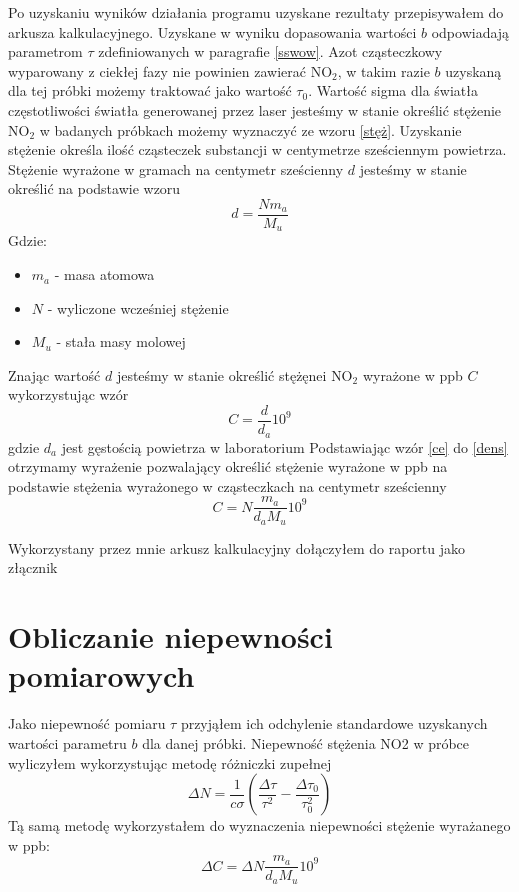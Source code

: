 \documentclass[10pt,a4paper]{article}
\begin{document}
Po uzyskaniu wyników działania programu uzyskane rezultaty przepisywałem do arkusza kalkulacyjnego. Uzyskane w wyniku dopasowania wartości $b$ odpowiadają parametrom $\tau$ zdefiniowanych w paragrafie \ref{sswow}. Azot cząsteczkowy wyparowany z ciekłej fazy nie powinien zawierać $\text{NO}_{\text{2}}$, w takim razie $b$ uzyskaną dla tej próbki możemy traktować jako wartość $\tau_0$. Wartość sigma dla światła częstotliwości  światła generowanej przez laser jesteśmy w stanie określić stężenie $\text{NO}_{\text{2}}$ w badanych próbkach możemy wyznaczyć ze wzoru \ref{stęż}.  Uzyskanie stężenie określa ilość cząsteczek substancji w centymetrze sześciennym powietrza.  
Stężenie wyrażone w gramach na centymetr sześcienny $d$ jesteśmy w stanie określić na podstawie wzoru
\begin{equation}
    \label{dens}
    d = \frac{N m_a}{M_u}
\end{equation}
Gdzie:
\begin{itemize}
    \item $m_a$ - masa atomowa
    \item $N$ - wyliczone wcześniej stężenie
    \item $M_u$ - stała masy molowej
\end{itemize}
 Znając wartość $d$ jesteśmy w stanie określić stężęnei $\text{NO}_{\text{2}}$ wyrażone w ppb $C$ wykorzystując wzór
\begin{equation}
    \label{ce}
    C=\frac{d}{d_a} 10^9
\end{equation}
gdzie $d_a$ jest gęstością powietrza w laboratorium
Podstawiając wzór \ref{ce} do \ref{dens} otrzymamy wyrażenie pozwalający określić stężenie wyrażone w ppb na podstawie stężenia wyrażonego w cząsteczkach na centymetr sześcienny
\begin{equation}
    \label{cer}
    C = N \frac{m_a}{d_a M_u}10^9
\end{equation}

Wykorzystany przez mnie arkusz kalkulacyjny dołączyłem do raportu jako złącznik


\section{Obliczanie niepewności pomiarowych}

Jako niepewność pomiaru $\tau$ przyjąłem ich odchylenie standardowe uzyskanych wartości parametru $b$ dla danej próbki. Niepewność stężenia NO2 w próbce wyliczyłem wykorzystując metodę różniczki zupełnej
\begin{equation}
    \label{niept}
    \Delta N = \frac{1}{c \sigma} \left(\frac{\Delta \tau}{\tau^2} - \frac{\Delta \tau_0}{\tau_0^2} \right)
\end{equation}
Tą samą metodę wykorzystałem do wyznaczenia niepewności stężenie wyrażanego w ppb:
\begin{equation}
    \label{niepn}
    \Delta C = \Delta N \frac{m_a}{d_a M_u}10^9
\end{equation}
\end{document}
